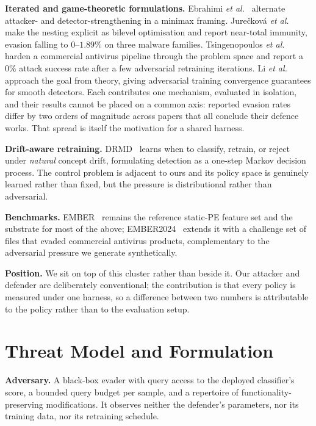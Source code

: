 \documentclass[conference]{IEEEtran}
\begin{document}
\textbf{Iterated and game-theoretic formulations.} Ebrahimi \emph{et
al.}~\cite{ebrahimi2022arl} alternate attacker- and detector-strengthening in a
minimax framing. Jure\v{c}kov\'{a} \emph{et al.}~\cite{jureckova2026bilevel}
make the nesting explicit as bilevel optimisation and report near-total
immunity, evasion falling to $0$--$1.89\%$ on three malware families.
Tsingenopoulos \emph{et al.}~\cite{tsingenopoulos2024raid} harden a commercial
antivirus pipeline through the problem space and report a $0\%$ attack success
rate after a few adversarial retraining iterations. Li \emph{et
al.}~\cite{li2024pad} approach the goal from theory, giving adversarial
training convergence guarantees for smooth detectors. Each contributes one
mechanism, evaluated in isolation, and their results cannot be placed on a
common axis: reported evasion rates differ by two orders of magnitude across
papers that all conclude their defence works. That spread is itself the
motivation for a shared harness.

\textbf{Drift-aware retraining.} DRMD~\cite{mcfadden2026drmd} learns when to
classify, retrain, or reject under \emph{natural} concept drift, formulating
detection as a one-step Markov decision process. The control problem is
adjacent to ours and its policy space is genuinely learned rather than fixed,
but the pressure is distributional rather than adversarial.

\textbf{Benchmarks.} EMBER~\cite{anderson2018ember} remains the reference
static-PE feature set and the substrate for most of the above;
EMBER2024~\cite{joyce2025ember2024} extends it with a challenge set of files
that evaded commercial antivirus products, complementary to the adversarial
pressure we generate synthetically.

\textbf{Position.} We sit on top of this cluster rather than beside it. Our
attacker and defender are deliberately conventional; the contribution is that
every policy is measured under one harness, so a difference between two numbers
is attributable to the policy rather than to the evaluation setup.

\section{Threat Model and Formulation}

\textbf{Adversary.} A black-box evader with query access to the deployed
classifier's score, a bounded query budget per sample, and a repertoire of
functionality-preserving modifications. It observes neither the defender's
parameters, nor its training data, nor its retraining schedule.
\end{document}
